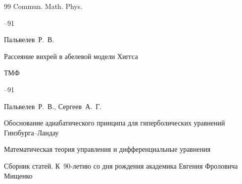 \begin{thebibliography}{99}
\jour Commun. Math. Phys. 




--91







\by Пальвелев~Р.~В.

\paper Рассеяние вихрей в абелевой модели Хиггса

\jour ТМФ




--91


















\by Пальвелев~Р.~В., Сергеев~А.~Г.

\paper Обоснование адиабатического принципа для гиперболических уравнений Гинзбурга--Ландау

\inbook Математическая теория управления и дифференциальные уравнения

\bookinfo Сборник статей. К~90-летию со дня рождения академика Евгения Фроловича Мищенко


\end{thebibliography}
